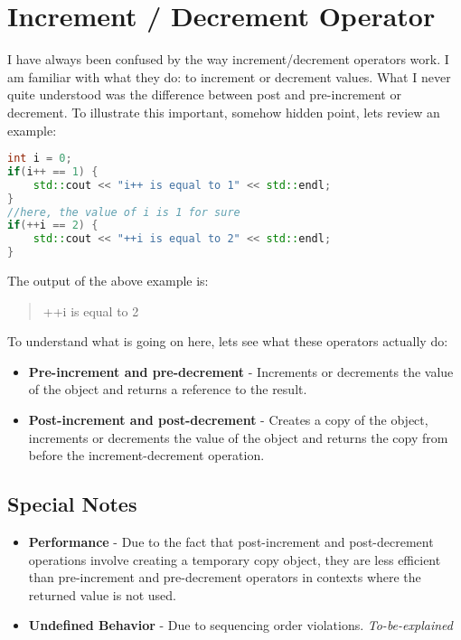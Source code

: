 \section{Increment / Decrement Operator}

I have always been confused by the way increment/decrement operators work. I am familiar with what they do: to increment or decrement values. What I never quite understood was the difference between post and pre-increment or decrement.
To illustrate this important, somehow hidden point, lets review an example:

\begin{lstlisting}[language=C++]
int i = 0;
if(i++ == 1) {
	std::cout << "i++ is equal to 1" << std::endl;
}
//here, the value of i is 1 for sure
if(++i == 2) {
	std::cout << "++i is equal to 2" << std::endl;
}
\end{lstlisting}

The output of the above example is:
\begin{quote}
++i is equal to 2
\end{quote}

To understand what is going on here, lets see what these operators actually do:
\begin{itemize}
\item \textbf{Pre-increment and pre-decrement} - Increments or decrements the value of the object and returns a reference to the result.
\item \textbf{Post-increment and post-decrement} - Creates a copy of the object, increments or decrements the value of the object and returns the copy from before the increment-decrement operation.
\end{itemize}

\subsection{Special Notes}
\begin{itemize}
\item \textbf{Performance} - Due to the fact that post-increment and post-decrement operations involve creating a temporary copy object, they are less efficient than pre-increment and pre-decrement operators in contexts where the returned value is not used.
\item \textbf{Undefined Behavior} - Due to sequencing order violations. \emph{To-be-explained}
\end{itemize}
